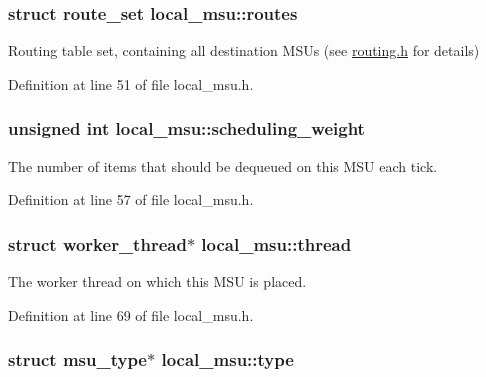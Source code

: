 \hypertarget{structlocal__msu_ad5a5a49f5e637d526668a373fd741ad8}{
\subsubsection[{routes}]{\setlength{\rightskip}{0pt plus 5cm}struct {\bf route\-\_\-set} local\-\_\-msu\-::routes}}\label{structlocal__msu_ad5a5a49f5e637d526668a373fd741ad8}


Routing table set, containing all destination M\-S\-Us (see \hyperlink{routing_8h}{routing.\-h} for details) 



Definition at line 51 of file local\-\_\-msu.\-h.

\hypertarget{structlocal__msu_afa2bd1495e53a10cf352af70aaaba10d}{
\subsubsection[{scheduling\-\_\-weight}]{\setlength{\rightskip}{0pt plus 5cm}unsigned int local\-\_\-msu\-::scheduling\-\_\-weight}}\label{structlocal__msu_afa2bd1495e53a10cf352af70aaaba10d}


The number of items that should be dequeued on this M\-S\-U each tick. 



Definition at line 57 of file local\-\_\-msu.\-h.

\hypertarget{structlocal__msu_a8f2b8ca820e060261f888b3bcb01d222}{
\subsubsection[{thread}]{\setlength{\rightskip}{0pt plus 5cm}struct {\bf worker\-\_\-thread}$\ast$ local\-\_\-msu\-::thread}}\label{structlocal__msu_a8f2b8ca820e060261f888b3bcb01d222}


The worker thread on which this M\-S\-U is placed. 



Definition at line 69 of file local\-\_\-msu.\-h.

\hypertarget{structlocal__msu_a4a5eb0c93e0be80ec816c050662885b3}{
\subsubsection[{type}]{\setlength{\rightskip}{0pt plus 5cm}struct {\bf msu\-\_\-type}$\ast$ local\-\_\-msu\-::type}}\label{structlocal__msu_a4a5eb0c93e0be80ec816c050662885b3}



